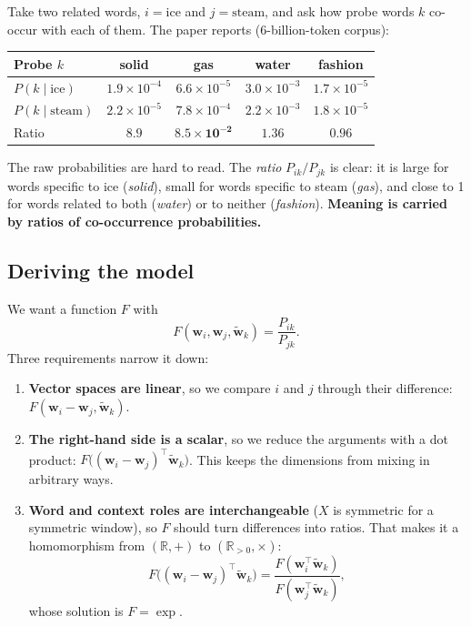 \documentclass[11pt,a4paper]{article}
\newcommand{\R}{\mathbb{R}}
\newcommand{\wv}{\mathbf{w}}
\newcommand{\cv}{\tilde{\mathbf{w}}}
\begin{document}
Take two related words, $i=\text{ice}$ and $j=\text{steam}$, and ask how probe words $k$
co-occur with each of them. The paper reports (6-billion-token corpus):

\begin{center}
\begin{tabular}{lcccc}
\toprule
Probe $k$ & solid & gas & water & fashion \\
\midrule
$P(k\mid\text{ice})$   & $1.9\times10^{-4}$ & $6.6\times10^{-5}$ & $3.0\times10^{-3}$ & $1.7\times10^{-5}$\\
$P(k\mid\text{steam})$ & $2.2\times10^{-5}$ & $7.8\times10^{-4}$ & $2.2\times10^{-3}$ & $1.8\times10^{-5}$\\
\midrule
Ratio & $\mathbf{8.9}$ & $\mathbf{8.5\times10^{-2}}$ & $1.36$ & $0.96$\\
\bottomrule
\end{tabular}
\end{center}

The raw probabilities are hard to read. The \emph{ratio} $P_{ik}/P_{jk}$ is clear: it is
large for words specific to ice (\emph{solid}), small for words specific to steam
(\emph{gas}), and close to 1 for words related to both (\emph{water}) or to neither
(\emph{fashion}). \textbf{Meaning is carried by ratios of co-occurrence probabilities.}

\subsection{Deriving the model}

We want a function $F$ with
\begin{equation}
  F(\wv_i, \wv_j, \cv_k) = \frac{P_{ik}}{P_{jk}}.
\end{equation}
Three requirements narrow it down:

\begin{enumerate}
  \item \textbf{Vector spaces are linear}, so we compare $i$ and $j$ through their difference:
        $F(\wv_i-\wv_j,\cv_k)$.
  \item \textbf{The right-hand side is a scalar}, so we reduce the arguments with a dot
        product: $F\big((\wv_i-\wv_j)^\top\cv_k\big)$. This keeps the dimensions from mixing in
        arbitrary ways.
  \item \textbf{Word and context roles are interchangeable} ($X$ is symmetric for a
        symmetric window), so $F$ should turn differences into ratios. That makes it a
        homomorphism from $(\R,+)$ to $(\R_{>0},\times)$:
        \[
          F\big((\wv_i-\wv_j)^\top\cv_k\big) = \frac{F(\wv_i^\top\cv_k)}{F(\wv_j^\top\cv_k)},
        \]
        whose solution is $F=\exp$.
\end{enumerate}
\end{document}
